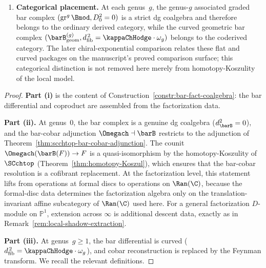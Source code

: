 \begin{theorem}
\begin{enumerate}[label=\textup{(\roman*)}]
\item \textbf{Categorical placement.} At each genus~$g$, the
 genus-$g$ associated graded bar complex
 $(\mathrm{gr}^g\, \Bmod, D_0^2 = 0)$ is a strict dg coalgebra
 and therefore belongs to the ordinary derived category,
 while the curved geometric bar complex
 $(\barB^{(g)}_{\mathrm{geom}}, \dfib^{\,2} =
 \kappaChHodge \cdot \omega_g)$ belongs to the coderived category.
 The later chiral-exponential comparison relates these flat and
 curved packages on the manuscript's proved comparison surface;
 this categorical distinction is not removed here merely from
 homotopy-Koszulity of the local model.
\end{enumerate}
\end{theorem}

\begin{proof}
\textbf{Part (i)} is the content of
Construction~\ref{constr:bar-fact-coalgebra}: the bar differential
and coproduct are assembled from the factorization data.

\smallskip\noindent
\textbf{Part (ii).} At genus~$0$, the bar complex is a genuine
dg coalgebra ($d_{\barB}^2 = 0$), and the bar-cobar adjunction
$\Omegach \dashv \barB$ restricts to the adjunction of
Theorem~\ref{thm:scchtop-bar-cobar-adjunction}. The counit
$\Omegach(\barB(F)) \to F$ is a quasi-isomorphism by the
homotopy-Koszulity of $\SCchtop$
(Theorem~\ref{thm:homotopy-Koszul}), which ensures that the
bar-cobar resolution is a cofibrant replacement. At the
factorization level, this statement lifts from operations
at formal discs to operations on $\Ran(\C)$, because the
formal-disc data determines the factorization algebra only on the
translation-invariant affine subcategory of $\Ran(\C)$ used here.
For a general factorization $D$-module on $\mathbb P^1$, extension
across $\infty$ is additional descent data, exactly as in
Remark~\ref{rem:local-shadow-extraction}.

\smallskip\noindent
\textbf{Part (iii).} At genus~$g \geq 1$, the bar differential is
curved ($\dfib^{\,2} = \kappaChHodge \cdot \omega_g$), and cobar
reconstruction is replaced by the Feynman transform. We recall
the relevant definitions.


\end{proof}
